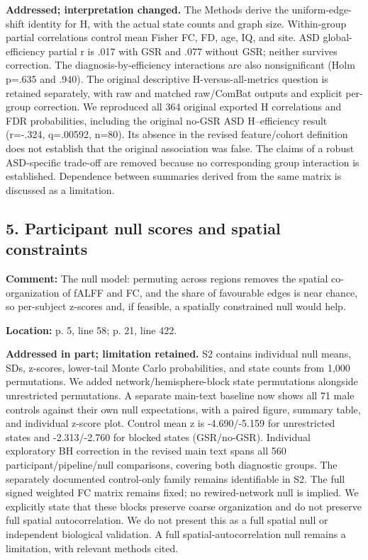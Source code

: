 \documentclass[11pt]{article}
\begin{document}
 \textbf{Addressed; interpretation changed.} The Methods derive the uniform-edge-shift identity for H, with the actual state counts and graph size. Within-group partial correlations control mean Fisher FC, FD, age, IQ, and site. ASD global-efficiency partial r is .017 with GSR and .077 without GSR; neither survives correction. The diagnosis-by-efficiency interactions are also nonsignificant (Holm p=.635 and .940). The original descriptive H-versus-all-metrics question is retained separately, with raw and matched raw/ComBat outputs and explicit per-group correction. We reproduced all 364 original exported H correlations and FDR probabilities, including the original no-GSR ASD H--efficiency result (r=-.324, q=.00592, n=80). Its absence in the revised feature/cohort definition does not establish that the original association was false. The claims of a robust ASD-specific trade-off are removed because no corresponding group interaction is established. Dependence between summaries derived from the same matrix is discussed as a limitation.


\subsection*{5. Participant null scores and spatial constraints}

\textbf{Comment:} The null model: permuting across regions removes the spatial co-organization of fALFF and FC, and the share of favourable edges is near chance, so per-subject z-scores and, if feasible, a spatially constrained null would help.


\textbf{Location:} p. 5, line 58; p. 21, line 422.


 \textbf{Addressed in part; limitation retained.} S2 contains individual null means, SDs, z-scores, lower-tail Monte Carlo probabilities, and state counts from 1,000 permutations. We added network/hemisphere-block state permutations alongside unrestricted permutations. A separate main-text baseline now shows all 71 male controls against their own null expectations, with a paired figure, summary table, and individual z-score plot. Control mean z is -4.690/-5.159 for unrestricted states and -2.313/-2.760 for blocked states (GSR/no-GSR). Individual exploratory BH correction in the revised main text spans all 560 participant/pipeline/null comparisons, covering both diagnostic groups. The separately documented control-only family remains identifiable in S2. The full signed weighted FC matrix remains fixed; no rewired-network null is implied. We explicitly state that these blocks preserve coarse organization and do not preserve full spatial autocorrelation. We do not present this as a full spatial null or independent biological validation. A full spatial-autocorrelation null remains a limitation, with relevant methods cited.
\end{document}
